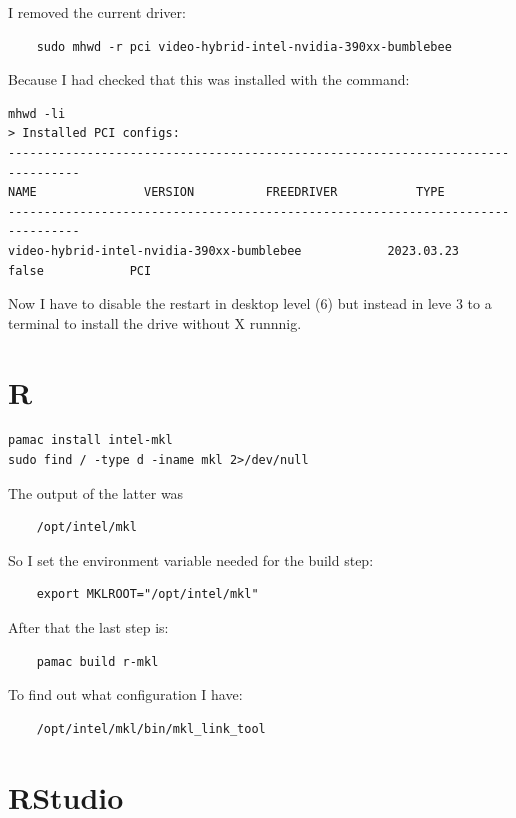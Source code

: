 \documentclass[]{scrartcl}
\begin{document}
I removed the current driver:
\begin{verbatim}
	sudo mhwd -r pci video-hybrid-intel-nvidia-390xx-bumblebee
\end{verbatim}

Because I had checked that this was installed with the command:
\begin{verbatim}
mhwd -li
> Installed PCI configs:
--------------------------------------------------------------------------------
NAME               VERSION          FREEDRIVER           TYPE
--------------------------------------------------------------------------------
video-hybrid-intel-nvidia-390xx-bumblebee            2023.03.23               false            PCI	
\end{verbatim}

Now I have to disable the restart in desktop level (6) but instead in leve 3 to a terminal to install the drive without X runnnig.




\section{R}

\begin{verbatim}
pamac install intel-mkl
sudo find / -type d -iname mkl 2>/dev/null
\end{verbatim}

The output of the latter was
\begin{verbatim}
	/opt/intel/mkl
\end{verbatim}

So I set the environment variable needed for the build step:

\begin{verbatim}
	export MKLROOT="/opt/intel/mkl"
\end{verbatim}

After that the last step is:

\begin{verbatim}
	pamac build r-mkl
\end{verbatim}

To find out what configuration I have:
\begin{verbatim}
	/opt/intel/mkl/bin/mkl_link_tool
\end{verbatim} 


\section{RStudio}
\end{document}
